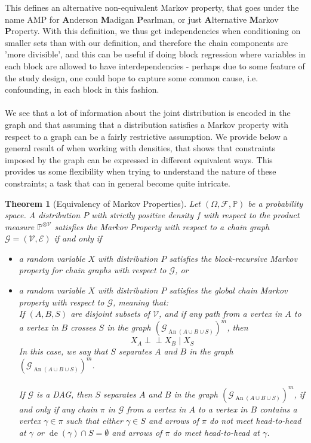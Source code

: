 \documentclass[11pt, a4paper]{memoir}
\theoremstyle{break}
\newtheorem{thm}{Theorem}
\theoremstyle{break}
\theoremstyle{nonumberplain}
\newcommand{\mP}{\mathbb{P}}
\newcommand{\indep}{\perp \!\!\! \perp}
\DeclareMathOperator{\de}{de}
\DeclareMathOperator{\an}{An}
\begin{document}
This defines an alternative non-equivalent Markov property, that goes under the name AMP for \textbf{A}nderson \textbf{M}adigan \textbf{P}earlman, or just \textbf{A}lternative \textbf{M}arkov \textbf{P}roperty. With this definition, we thus get independencies when conditioning on smaller sets than with our definition, and therefore the chain components are 'more divisible', and this can be useful if doing block regression where variables in each block are allowed to have interdependencies - perhaps due to some feature of the study design, one could hope to capture some common cause, i.e. confounding, in each block in this fashion.
\\\\
We see that a lot of information about the joint distribution is encoded in the graph and that assuming that a distribution satisfies a Markov property with respect to a graph can be a fairly restrictive assumption. We provide below a general result of \cite{Steffen} when working with densities, that shows that constraints imposed by the graph can be expressed in different equivalent ways. This provides us some flexibility when trying to understand the nature of these constraints; a task that can in general become quite intricate.
\begin{thm}[Equivalency of Markov Properties]\label{equiv}
Let $(\Omega, \mathcal{F}, \mP)$ be a probability space. A distribution $P$ with strictly positive density $f$ with respect to the product measure $\mP^{\otimes \mathcal{V}}$ satisfies the Markov Property with respect to a chain graph $\mathcal{G}=(\mathcal{V},\mathcal{E})$ if and only if
\begin{itemize}
	\item a random variable $X$ with distribution $P$ satisfies the block-recursive Markov property for chain graphs with respect to $\mathcal{G}$, or
	\item a random variable $X$ with distribution $P$ satisfies the \emph{global chain Markov property} with respect to $\mathcal{G}$, meaning that:\\ If $(A,B,S)$ are disjoint subsets of $\mathcal{V}$, and if any path from a vertex in $A$ to a vertex in $B$ crosses $S$ in the graph $\left(\mathcal{G}_{\an(A\cup B\cup S)}\right)^m$, then
	$$X_A\indep X_B\mid X_S$$
	In this case, we say that $S$ separates $A$ and $B$ in the graph $\left(\mathcal{G}_{\an(A\cup B\cup S)}\right)^m$.\\\\
	If $\mathcal{G}$ is a DAG, then $S$ separates $A$ and $B$ in the graph $\left(\mathcal{G}_{\an(A\cup B\cup S)}\right)^m$, if and only if any chain $\pi$ in $\mathcal{G}$ from a vertex in $A$ to a vertex in $B$ contains a vertex $\gamma\in \pi$ such that either $\gamma\in S$ and arrows of $\pi$ do not meet head-to-head at $\gamma$ or $\de(\gamma)\cap S=\emptyset$ and arrows of $\pi$ do meet head-to-head at $\gamma$. 
\end{itemize}
\end{thm}
\end{document}

